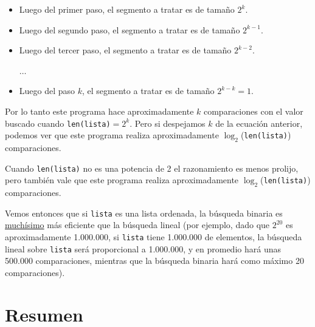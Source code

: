 \begin{itemize}
\item Luego del primer paso, el segmento a tratar es de tamaño $2^k$.
\item Luego del segundo paso, el segmento a tratar es de tamaño $2^{k-1}$.
\item Luego del tercer paso, el segmento a tratar es de tamaño $2^{k-2}$.

$\ldots$

\item Luego del paso $k$, el segmento a tratar es de tamaño $2^{k-k}=1$.
\end{itemize}

Por lo tanto este programa hace aproximadamente $k$ comparaciones con el valor
buscado cuando \lstinline+len(lista)+$= 2^k$.
Pero si despejamos $k$ de la ecuación anterior, podemos ver que este programa
realiza aproximadamente $\log_2$(\lstinline+len(lista)+) comparaciones.

Cuando \lstinline+len(lista)+ no es una potencia de 2 el razonamiento es menos
prolijo, pero también vale que este programa realiza aproximadamente
$\log_2$(\lstinline+len(lista)+) comparaciones.

Vemos entonces que si \lstinline!lista! es una lista ordenada, la búsqueda binaria es
\underline{muchísimo} más eficiente que la búsqueda lineal (por ejemplo, dado
que $2^{20}$ es aproximadamente 1.000.000, si \lstinline!lista! tiene 1.000.000 de
elementos, la búsqueda lineal sobre \lstinline+lista+ será proporcional a 1.000.000, y
en promedio hará unas 500.000 comparaciones, mientras que la búsqueda binaria
hará como máximo 20 comparaciones).

\section{Resumen}

